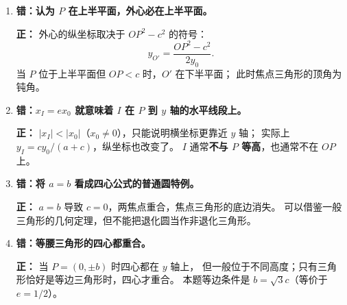 \begin{trapbox}
\begin{enumerate}
 \item \textbf{错：认为 $P$ 在上半平面，外心必在上半平面。}

 \textbf{正：} 外心的纵坐标取决于 $OP^2-c^2$ 的符号：
 \[
 y_{O'}=\frac{OP^2-c^2}{2y_0}.
 \]
 当 $P$ 位于上半平面但 $OP<c$ 时，$O'$ 在下半平面；
 此时焦点三角形的顶角为钝角。

 \item \textbf{错：$x_I=ex_0$ 就意味着 $I$ 在 $P$ 到 $y$ 轴的水平线段上。}

 \textbf{正：} $|x_I|<|x_0|$（$x_0\ne0$），只能说明横坐标更靠近 $y$ 轴；
 实际上 $y_I=cy_0/(a+c)$，纵坐标也改变了。
 $I$ 通常\textbf{不与 $P$ 等高}，也通常不在 $OP$ 上。

 \item \textbf{错：将 $a=b$ 看成四心公式的普通圆特例。}

 \textbf{正：} $a=b$ 导致 $c=0$，两焦点重合，焦点三角形的底边消失。
 可以借鉴一般三角形的几何定理，但不能把退化圆当作非退化三角形。

 \item \textbf{错：等腰三角形的四心都重合。}

 \textbf{正：} 当 $P=(0,\pm b)$ 时四心都在 $y$ 轴上，
 但一般位于不同高度；只有三角形恰好是等边三角形时，四心才重合。
 本题等边条件是 $b=\sqrt3c$（等价于 $e=1/2$）。
\end{enumerate}
\end{trapbox}
